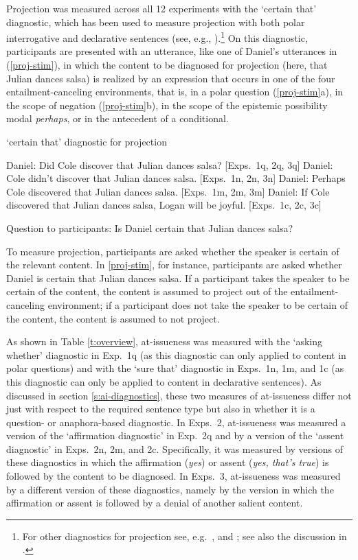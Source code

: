 \documentclass[11pt,fleqn]{article}
\newcommand{\6}{\mbox{$[\hspace*{-.6mm}[$}}
\newcommand{\9}{\mbox{$]\hspace*{-.6mm}]$}}
\begin{document}
Projection was measured across all 12 experiments with the `certain that' diagnostic, which has been used to measure projection with both polar interrogative and declarative sentences (see, e.g., \citealt{tonhauser-salt26,djaerv-bacovcin-salt27,stevens-etal2017,lorson2018,tbd-variability,mahler-nels,mahler2020,demarneffe-etal-sub23}).\footnote{For other diagnostics for projection see, e.g.\ \citealt{smith-hall11,xue-onea11}, and \citealt{brst-lang11}; see also the discussion in \citealt{tbd-variability}.}  On this diagnostic, participants are presented with an utterance, like one of Daniel's utterances in (\ref{proj-stim}), in which the content to be diagnosed for projection (here, that Julian dances salsa) is realized by an expression that occurs in one of the four entailment-canceling environments, that is, in a polar question (\ref{proj-stim}a), in the scope of negation (\ref{proj-stim}b), in the scope of the epistemic possibility modal {\em perhaps}, or in the antecedent of a conditional.

\begin{exe}
\ex\label{proj-stim} `certain that' diagnostic for projection
\begin{xlist}
\ex Daniel: Did Cole discover that Julian dances salsa? \hfill [Exps.~1q, 2q, 3q]
\ex Daniel: Cole didn't discover that Julian dances salsa. \hfill [Exps.~1n, 2n, 3n]
\ex Daniel: Perhaps Cole discovered that Julian dances salsa. \hfill [Exps.~1m, 2m, 3m]
\ex Daniel: If Cole discovered that Julian dances salsa, Logan will be joyful. \hfill [Exps.~1c, 2c, 3c]
\end{xlist}
Question to participants: Is Daniel certain that Julian dances salsa?
\end{exe}
To measure projection, participants are asked whether the speaker is certain of the relevant content. In \ref{proj-stim}, for instance, participants are asked whether Daniel is certain that Julian dances salsa. If a participant takes the speaker to be certain of the content, the content is assumed to project out of the entailment-canceling environment; if a participant does not take the speaker to be certain of the content, the content is assumed to not project. 

As shown in Table \ref{t:overview}, at-issueness was measured with the `asking whether' diagnostic in Exp.~1q (as this diagnostic can only applied to content in polar questions) and with the `sure that' diagnostic in Exps.~1n, 1m, and 1c (as this diagnostic can only be applied to content in declarative sentences). As discussed in section \ref{s:ai-diagnostics}, these two measures of at-issueness differ not just with respect to the required sentence type but also in whether it is a question- or anaphora-based diagnostic. In Exps.~2, at-issueness was measured a version of the `affirmation diagnostic' in Exp.~2q and by a version of the `assent diagnostic' in Exps.~2n, 2m, and 2c. Specifically, it was measured by versions of these diagnostics in which the affirmation ({\em yes}) or assent ({\em yes, that's true}) is followed by the content to be diagnosed. In Exps.~3, at-issueness was measured by a different version of these diagnostics, namely by the version in which the affirmation or assent is followed by a denial of another salient content.
\end{document}
